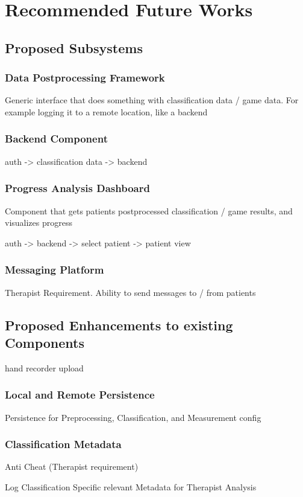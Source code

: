 \chapter{Recommended Future Works}
\label{sec:future}
\section{Proposed Subsystems}
\subsection{Data Postprocessing Framework}
Generic interface that does something with classification data / game data. For example logging it to a remote location, like a backend

\subsection{Backend Component}

auth -> classification data -> backend
\subsection{Progress Analysis Dashboard}
Component that gets patients postprocessed classification / game results, and visualizes progress

auth -> backend -> select patient -> patient view
\subsection{Messaging Platform}
Therapist Requirement. Ability to send messages to / from patients
\section{Proposed Enhancements to existing Components}
hand recorder upload
\subsection{Local and Remote Persistence}
Persistence for Preprocessing, Classification, and Measurement config
\subsection{Classification Metadata}
Anti Cheat (Therapist requirement)

Log Classification Specific relevant Metadata for Therapist Analysis
